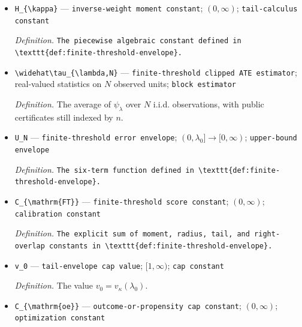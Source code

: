 \documentclass{article}
\begin{document}
\begin{itemize}
  \item \texttt{H\_\allowbreak{}\{\textbackslash{}\allowbreak{}kappa\}\allowbreak{}} --- \texttt{inverse-\allowbreak{}weight moment constant}; \((0,\infty)\); \texttt{tail-\allowbreak{}calculus constant}
  \par\smallskip\noindent\emph{Definition.} \texttt{The piecewise algebraic constant defined in \textbackslash{}\allowbreak{}texttt\{def:\allowbreak{}finite-\allowbreak{}threshold-\allowbreak{}envelope\}\allowbreak{}.}
  \item \texttt{\textbackslash{}\allowbreak{}widehat\textbackslash{}\allowbreak{}tau\_\allowbreak{}\{\textbackslash{}\allowbreak{}lambda,\allowbreak{}N\}\allowbreak{}} --- \texttt{finite-\allowbreak{}threshold clipped ATE estimator}; real-valued statistics on \(N\) observed units; \texttt{block estimator}
  \par\smallskip\noindent\emph{Definition.} The average of \(\psi_\lambda\) over \(N\) i.i.d. observations, with public certificates still indexed by \(n\).
  \item \texttt{U\_\allowbreak{}N} --- \texttt{finite-\allowbreak{}threshold error envelope}; \((0,\lambda_0]\to[0,\infty)\); \texttt{upper-\allowbreak{}bound envelope}
  \par\smallskip\noindent\emph{Definition.} \texttt{The six-\allowbreak{}term function defined in \textbackslash{}\allowbreak{}texttt\{def:\allowbreak{}finite-\allowbreak{}threshold-\allowbreak{}envelope\}\allowbreak{}.}
  \item \texttt{C\_\allowbreak{}\{\textbackslash{}\allowbreak{}mathrm\{FT\}\allowbreak{}\}\allowbreak{}} --- \texttt{finite-\allowbreak{}threshold score constant}; \((0,\infty)\); \texttt{calibration constant}
  \par\smallskip\noindent\emph{Definition.} \texttt{The explicit sum of moment,\allowbreak{} radius,\allowbreak{} tail,\allowbreak{} and right-\allowbreak{}overlap constants in \textbackslash{}\allowbreak{}texttt\{def:\allowbreak{}finite-\allowbreak{}threshold-\allowbreak{}envelope\}\allowbreak{}.}
  \item \texttt{v\_\allowbreak{}0} --- \texttt{tail-\allowbreak{}envelope cap value}; \([1,\infty)\); \texttt{cap constant}
  \par\smallskip\noindent\emph{Definition.} The value \(v_0=v_{\kappa}(\lambda_0)\).
  \item \texttt{C\_\allowbreak{}\{\textbackslash{}\allowbreak{}mathrm\{oe\}\allowbreak{}\}\allowbreak{}} --- \texttt{outcome-\allowbreak{}or-\allowbreak{}propensity cap constant}; \((0,\infty)\); \texttt{optimization constant}

\end{itemize}
\end{document}
